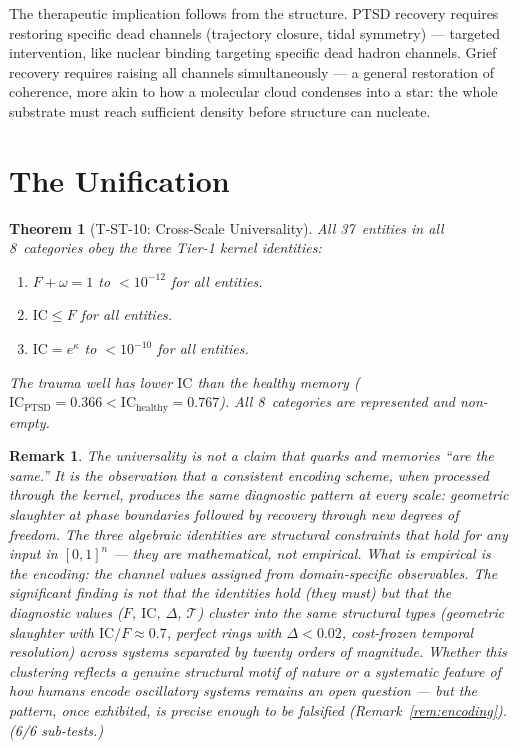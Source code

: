 \documentclass[
  aps,
  prd,
  twocolumn,
  superscriptaddress,
  nofootinbib,
  floatfix
]{revtex4-2}
\newtheorem{theorem}{Theorem}
\newtheorem{remark}{Remark}
\newcommand{\IC}{\mathrm{IC}}
\begin{document}
The therapeutic implication follows from the structure.
PTSD recovery requires restoring specific dead channels
(trajectory closure, tidal symmetry) --- targeted
intervention, like nuclear binding targeting specific
dead hadron channels.  Grief recovery requires raising all
channels simultaneously --- a general restoration of
coherence, more akin to how a molecular cloud condenses
into a star: the whole substrate must reach sufficient
density before structure can nucleate.


\section{The Unification}\label{sec:unification}

\begin{theorem}[T-ST-10: Cross-Scale Universality]
\label{thm:T10}
All 37~entities in all 8~categories obey the three Tier-1
kernel identities:
\begin{enumerate}
\item $F + \omega = 1$ to $< 10^{-12}$ for all entities.
\item $\IC \leq F$ for all entities.
\item $\IC = e^{\kappa}$ to $< 10^{-10}$ for all entities.
\end{enumerate}
The trauma well has lower $\IC$ than the healthy memory
($\IC_{\text{PTSD}} = 0.366 < \IC_{\text{healthy}} = 0.767$).
All 8~categories are represented and non-empty.
\end{theorem}

\begin{remark}
The universality is not a claim that quarks and memories
``are the same.''  It is the observation that a consistent
encoding scheme, when processed through the kernel, produces
the same diagnostic pattern at every scale: geometric
slaughter at phase boundaries followed by recovery through
new degrees of freedom.  The three algebraic identities are
structural constraints that hold for \emph{any} input in
$[0,1]^n$ --- they are mathematical, not empirical.  What is
empirical is the encoding: the channel values assigned from
domain-specific observables.  The significant finding is not
that the identities hold (they must) but that the
\emph{diagnostic values} ($F$, $\IC$, $\Delta$, $\mathcal{T}$)
cluster into the same structural types (geometric slaughter
with $\IC/F \approx 0.7$, perfect rings with $\Delta < 0.02$,
cost-frozen temporal resolution) across systems separated by
twenty orders of magnitude.  Whether this clustering reflects
a genuine structural motif of nature or a systematic feature
of how humans encode oscillatory systems remains an open
question --- but the pattern, once exhibited, is precise
enough to be falsified (Remark~\ref{rem:encoding}).
(6/6 sub-tests.)
\end{remark}
\end{document}

